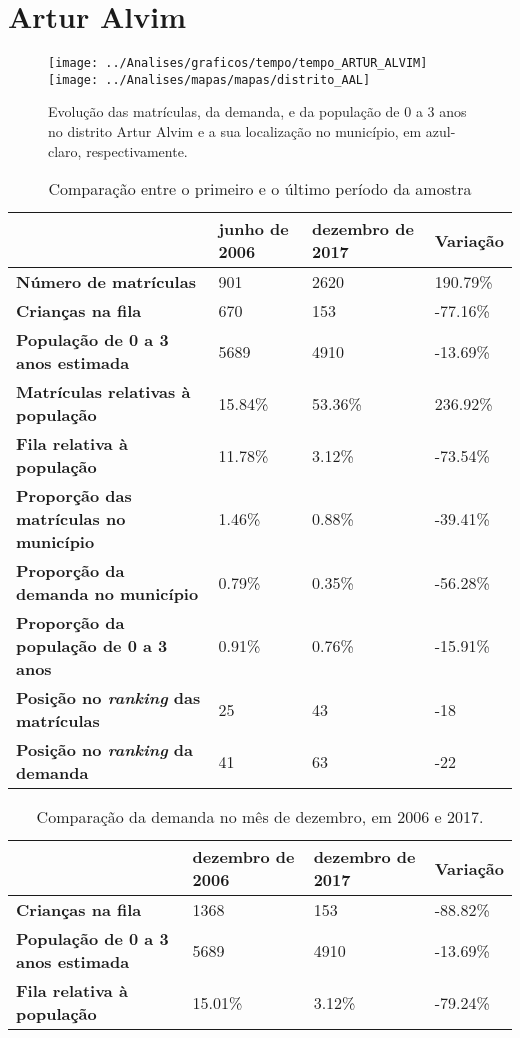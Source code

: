 \section{Artur Alvim}
\begin{figure}[H]
\centering
\texttt{[image: ../Analises/graficos/tempo/tempo\_ARTUR\_ALVIM]}
\texttt{[image: ../Analises/mapas/mapas/distrito\_AAL]}
\caption{Evolução das matrículas, da demanda, e da população de 0 a 3 anos no distrito Artur Alvim e a sua localização no município, em azul-claro, respectivamente.}
\end{figure}
\begin{table}[H]
\begin{tabular}{l|l|l|l}
\textbf{}                                      & \textbf{junho de 2006}       & \textbf{dezembro de 2017}    & \textbf{Variação} \\ \hline
\textbf{Número de matrículas}                  & 901 & 2620 & 190.79\% \\ \hline
\textbf{Crianças na fila}                      & 670 & 153 & -77.16\% \\ \hline
\textbf{População de 0 a 3 anos estimada}      & 5689 & 4910 & -13.69\% \\ \hline
\textbf{Matrículas relativas à população}      & 15.84\% & 53.36\% & 236.92\% \\ \hline
\textbf{Fila relativa à população}             & 11.78\% & 3.12\% & -73.54\% \\ \hline
\textbf{Proporção das matrículas no município} & 1.46\% & 0.88\% & -39.41\% \\ \hline
\textbf{Proporção da demanda no município}     & 0.79\% & 0.35\% & -56.28\% \\ \hline
\textbf{Proporção da população de 0 a 3 anos}  & 0.91\% & 0.76\% & -15.91\% \\ \hline
\textbf{Posição no \textit{ranking} das matrículas}     & 25 & 43 & -18 \\ \hline
\textbf{Posição no \textit{ranking} da demanda}         & 41 & 63 & -22 \\ 
\end{tabular}
\caption{Comparação entre o primeiro e o último período da amostra}
\end{table}
\begin{table}[H]
\begin{tabular}{l|l|l|l}
\textbf{}                                 & \textbf{dezembro de 2006} & \textbf{dezembro de 2017} & \textbf{Variação} \\ \hline
\textbf{Crianças na fila}                      & 1368 & 153 & -88.82\% \\ \hline
\textbf{População de 0 a 3 anos estimada}      & 5689 & 4910 & -13.69\% \\ \hline
\textbf{Fila relativa à população}             & 15.01\% & 3.12\% & -79.24\% \\
\end{tabular}
\caption{Comparação da demanda no mês de dezembro, em 2006 e 2017.}
\end{table}
